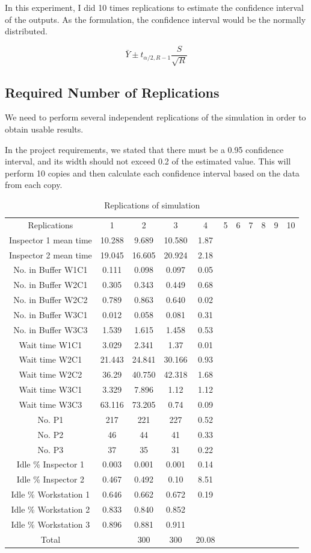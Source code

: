 \documentclass{article}
\begin{document}
In this experiment, I did 10 times replications to estimate the confidence interval of the outputs. As the formulation, the confidence interval would be the normally distributed.

\begin{equation}
\bar Y\pm t_{\alpha / 2, R-1}\frac{S}{\sqrt R}
\end{equation}


\subsection{Required Number of Replications}
We need to perform several independent replications of the simulation in order to obtain usable results.

In the project requirements, we stated that there must be a 0.95 confidence interval, and its width should not exceed 0.2 of the estimated value. This will perform 10 copies and then calculate each confidence interval based on the data from each copy.

\begin{table}[htp]
\caption{Replications of simulation}
\begin{center}
\begin{tabular}{ccccccccccc}
\hline
Replications & 1 & 2 & 3 & 4 & 5 & 6 & 7 & 8 & 9 & 10\\
Inspector 1 mean time&10.288&9.689&10.580&1.87\\
Inspector 2 mean time&19.045&16.605&20.924&2.18\\
No. in Buffer W1C1&0.111&0.098&0.097&0.05\\
No. in Buffer W2C1&0.305&0.343&0.449&0.68\\
No. in Buffer W2C2&0.789&0.863&0.640&0.02\\
No. in Buffer W3C1&0.012&0.058&0.081&0.31\\
No. in Buffer W3C3&1.539&1.615&1.458&0.53\\
Wait time W1C1&3.029&2.341&1.37&0.01\\
Wait time W2C1&21.443&24.841&30.166&0.93\\
Wait time W2C2&36.29&40.750&42.318&1.68\\
Wait time W3C1&3.329&7.896&1.12&1.12\\
Wait time W3C3&63.116&73.205&0.74&0.09\\
No. P1&217&221&227&0.52\\
No. P2&46&44&41&0.33\\
No. P3&37&35&31&0.22\\
Idle \% Inspector 1&0.003&0.001&0.001&0.14\\
Idle \% Inspector 2&0.467&0.492&0.10&8.51\\
Idle \% Workstation 1&0.646&0.662&0.672&0.19\\
Idle \% Workstation 2&0.833&0.840&0.852&&&&&\\
Idle \% Workstation 3&0.896&0.881&0.911&&&&&\\
\hline
Total& &300&300&20.08\\

\hline

\end{tabular}
\end{center}
\label{default}
\end{table}%
\end{document}
